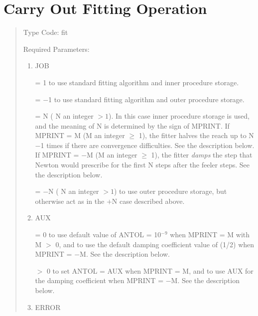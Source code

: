 \section{Carry Out Fitting Operation} 
\begin{quotation}
\noindent Type Code:  fit
\vspace{5mm}

\noindent Required Parameters:
\begin{enumerate}
      \item  JOB

             = 1 to use standard fitting algorithm and inner procedure storage.

             = $-$1 to use standard fitting algorithm and outer procedure storage.

             = N ( N an integer $> 1$).  In this case inner procedure storage is used, and \hspace*{1em}the meaning of N is determined by the sign of MPRINT.  If MPRINT = \hspace*{1em}M (M an integer $\geq$ 1), the fitter halves the reach up to N$-$1 times if \hspace*{1em}there are convergence difficulties.  See the description below.  If MPRINT \hspace*{1em}= $-$M (M an integer $\geq$ 1), the fitter {\em damps} the step that Newton would \hspace*{1em}prescribe for the first N steps after the feeler steps.  See the description \hspace*{1em}below.

             = $-$N ( N an integer $> 1$) to use outer procedure storage, but otherwise act \hspace*{1em}as in the $+$N case described above.

      \item  AUX

	         = 0 to use default value of ANTOL = 10$^{-9}$ when MPRINT = M with \hspace*{1em}M $>$ 0, and to use the default damping coefficient value of (1/2) when  \hspace*{1em}MPRINT = $-$M.  See the description below.

			 $>$ 0 to set ANTOL = AUX when MPRINT = M, and to use AUX for the \hspace*{1em}damping coefficient when MPRINT = $-$M.  See the description below.

      \item  ERROR


\end{enumerate}
\end{quotation}
